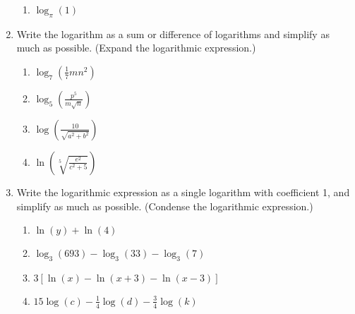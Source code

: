 \begin{enumerate}
\begin{enumerate}
\item $\log_{\pi}(1)$\\



\end{enumerate}






\item Write the logarithm as a sum or difference of logarithms and simplify as much as possible.  (Expand the logarithmic expression.)
\begin{enumerate}
\item $ \displaystyle \log_7\left(\frac{1}{7}mn^2\right)$ 
\vfill
\item $\displaystyle \log_5\left(\frac{p^5}{m\sqrt{n}}\right)$ 
\vfill

\item $\displaystyle \log\left(\frac{10}{\sqrt{a^2+b^2}}\right)$ 
\vfill

\item $\displaystyle \ln\left(\sqrt[5]{\frac{e^2}{c^2+5}}\right)$ 
\vfill


\end{enumerate}

\clearpage

\item Write the logarithmic expression as a single logarithm with coefficient 1, and simplify as much as possible.  (Condense the logarithmic expression.)


\begin{enumerate}
\item $\ln(y)+\ln(4)$\vfill
\item $\log_3(693)-\log_3(33)-\log_3(7)$\vfill
\item $3[\ln(x)-\ln(x+3)-\ln(x-3)]$\vfill
\item $\displaystyle 15\log(c)-\frac{1}{4}\log(d)-\frac{3}{4}\log(k)$\vfill
\end{enumerate}






\end{enumerate}


